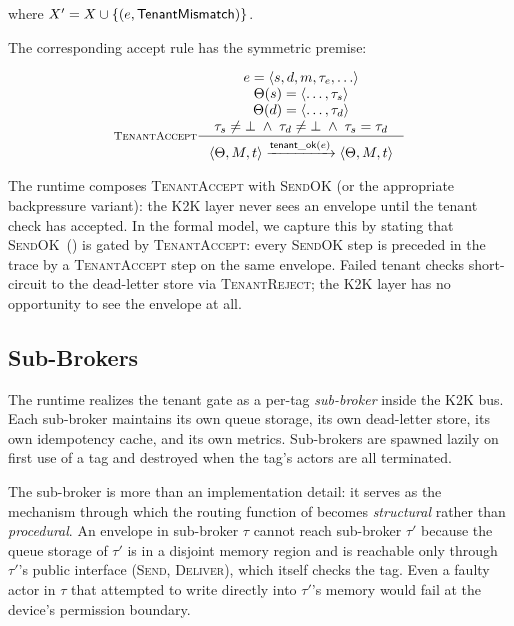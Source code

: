 \noindent where \(X' = X \cup \{(e, \mathsf{TenantMismatch})\}\).

The corresponding accept rule has the symmetric premise:

\begin{equation}
\inference[\textsc{TenantAccept}]
{
  e = \langle s, d, m, \tau_e, \ldots\rangle \\
  \Theta(s) = \langle \ldots, \tau_s\rangle \\
  \Theta(d) = \langle \ldots, \tau_d\rangle \\
  \tau_s \neq \bot \;\land\; \tau_d \neq \bot \;\land\; \tau_s = \tau_d
}
{
  \langle \Theta, M, t\rangle
  \trans{\mathsf{tenant\_ok}(e)}
  \langle \Theta, M, t\rangle
}
\label{rule:tenant-accept}
\end{equation}

The runtime composes \textsc{TenantAccept} with \textsc{SendOK} (or
the appropriate backpressure variant): the K2K layer never sees an
envelope until the tenant check has accepted.  In the formal model,
we capture this by stating that \textsc{SendOK}~()
is gated by \textsc{TenantAccept}: every \textsc{SendOK} step is
preceded in the trace by a \textsc{TenantAccept} step on the same
envelope.  Failed tenant checks short-circuit to the dead-letter
store via \textsc{TenantReject}; the K2K layer has no opportunity to
see the envelope at all.

\subsection{Sub-Brokers}
\label{sec:tenancy:subbrokers}

The runtime realizes the tenant gate as a per-tag \emph{sub-broker}
inside the K2K bus.  Each sub-broker maintains its own queue
storage, its own dead-letter store, its own idempotency cache, and
its own metrics.  Sub-brokers are spawned lazily on first use of a
tag and destroyed when the tag's actors are all terminated.

The sub-broker is more than an implementation detail: it serves
as the mechanism through which the routing function of
 becomes \emph{structural} rather than
\emph{procedural}.  An envelope in sub-broker \(\tau\) cannot reach
sub-broker \(\tau'\) because the queue storage of \(\tau'\) is in a
disjoint memory region and is reachable only through \(\tau'\)'s
public interface (\textsc{Send}, \textsc{Deliver}), which itself
checks the tag.  Even a faulty actor in \(\tau\) that attempted to
write directly into \(\tau'\)'s memory would fail at the device's
permission boundary.

